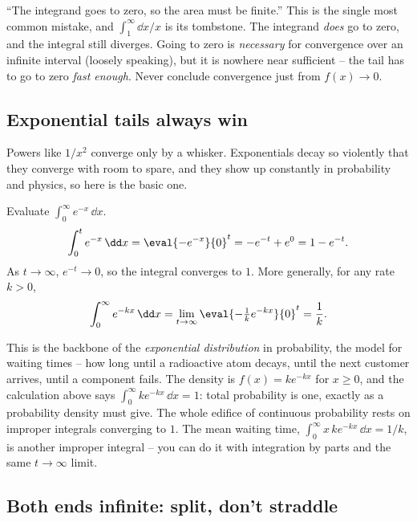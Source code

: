\begin{trapbox}
``The integrand goes to zero, so the area must be finite.'' This is the single
most common mistake, and $\int_1^\infty \dd x/x$ is its tombstone. The integrand
\emph{does} go to zero, and the integral still diverges. Going to zero is
\emph{necessary} for convergence over an infinite interval (loosely speaking), but
it is nowhere near sufficient -- the tail has to go to zero \emph{fast enough}.
Never conclude convergence just from $f(x)\to 0$.
\end{trapbox}

\subsection{Exponential tails always win}
\label{ch25:exp-tails}

Powers like $1/x^2$ converge only by a whisker. Exponentials decay so violently
that they converge with room to spare, and they show up constantly in probability
and physics, so here is the basic one.

\begin{example}
\label{ch25:ex-exp}
Evaluate $\displaystyle\int_0^{\infty} e^{-x}\,\dd x$.
\[
  \int_0^{t} e^{-x}\,\dd x
  = \eval{-e^{-x}}{0}^{t}
  = -e^{-t} + e^{0}
  = 1 - e^{-t}.
\]
As $t\to\infty$, $e^{-t}\to 0$, so the integral converges to $1$. More generally,
for any rate $k>0$,
\[
  \int_0^{\infty} e^{-kx}\,\dd x
  = \lim_{t\to\infty}\eval{-\tfrac{1}{k}e^{-kx}}{0}^{t}
  = \frac{1}{k}.
\]
\end{example}

\begin{applicationbox}
This is the backbone of the \emph{exponential distribution} in probability, the
model for waiting times -- how long until a radioactive atom decays, until the next
customer arrives, until a component fails. The density is $f(x) = k e^{-kx}$ for
$x \ge 0$, and the calculation above says $\int_0^\infty k e^{-kx}\,\dd x = 1$:
total probability is one, exactly as a probability density must give. The whole
edifice of continuous probability rests on improper integrals converging to $1$.
The mean waiting time, $\int_0^\infty x\,k e^{-kx}\,\dd x = 1/k$, is another
improper integral -- you can do it with integration by parts and the same
$t\to\infty$ limit.
\end{applicationbox}

\subsection{Both ends infinite: split, don't straddle}
\label{ch25:both-ends}

